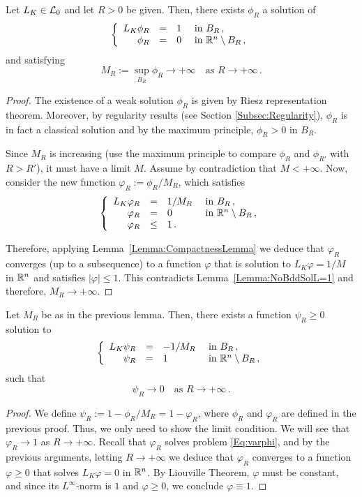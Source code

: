 \begin{lemma}
\label{Lemma:SolBall}
Let $L_K \in \mathcal{L}_0$ and let $R>0$ be given. Then, there exists $\phi_R$ a solution of
\begin{equation*}
\left\{\begin{array}{rcll}
L_K  \phi_R &=& 1 & \textrm{ in } B_R\,,\\
\phi_R &=& 0 & \textrm{ in } \mathbb{R}^n\setminus B_R\,,
\end{array} \right.
\end{equation*}
and satisfying
$$
M_R:= \sup_{B_R} \phi_R \to +\infty \quad \text{as } R\to +\infty\,.
$$
\end{lemma}
\begin{proof}
The existence of a weak solution $\phi_R$ is given by Riesz representation theorem. Moreover, by regularity results (see Section \ref{Subsec:Regularity}), $\phi_R$ is in fact a classical solution and by the maximum principle, $\phi_R>0$ in $B_R$.

Since $M_R$ is increasing (use the maximum principle to compare $\phi_R$ and $\phi_{R'}$ with $R>R'$), it must have a limit $M$. Assume by contradiction that $M<+\infty$. Now, consider the new function $ \varphi_R := \phi_R/M_R$, which satisfies
\begin{equation}
\label{Eq:varphi}
\left\{\begin{array}{rcll}
L_K  \varphi_R &=& 1/M_R & \textrm{ in } B_R\,,\\
\varphi_R &=& 0 & \textrm{ in } \mathbb{R}^n\setminus B_R\,, \\
\varphi_R &\leq & 1\,.
\end{array} \right.
\end{equation}

Therefore, applying Lemma~\ref{Lemma:CompactnessLemma} we deduce that $\varphi_R$ converges (up to a subsequence) to a function $\varphi$ that is solution to $L_K  \varphi = 1/M$ in $\mathbb{R}^n$ and satisfies  $|\varphi| \leq 1$. This contradicts Lemma~\ref{Lemma:NoBddSolL=1} and therefore, $M_R \to +\infty$.
\end{proof}

\begin{lemma}
\label{Lemma:SolBallToZero}
Let $M_R$ be as in the previous lemma. Then, there exists a function $\psi_R\geq 0$ solution to
\begin{equation*}
\left\{\begin{array}{rcll}
L_K  \psi_R &=& -1/M_R & \textrm{ in } B_R\,,\\
\psi_R &=& 1 & \textrm{ in } \mathbb{R}^n\setminus B_R\,,
\end{array} \right.
\end{equation*}
such that
$$ \psi_R \to  0 \quad \text{as } R\to +\infty\,. $$
\end{lemma}

\begin{proof}
We define $ \psi_R := 1-\phi_R/M_R = 1-\varphi_R$, where $\phi_R$ and $\varphi_R$ are defined in
the previous proof. Thus, we only need to show the limit condition. We will see that $\varphi_R \to
1$ as $R\to +\infty$. Recall that $\varphi_R$ solves problem \eqref{Eq:varphi}, and by the previous
arguments, letting $R\to +\infty$ we deduce that $\varphi_R$ converges to a function $\varphi\geq
0$ that solves $ L_K \varphi = 0 $ in $\mathbb{R}^n$. By Liouville Theorem, $\varphi$ must be constant, and
since its $L^\infty$-norm is $1$ and $\varphi\geq 0$, we conclude $\varphi\equiv 1$.
\end{proof}

